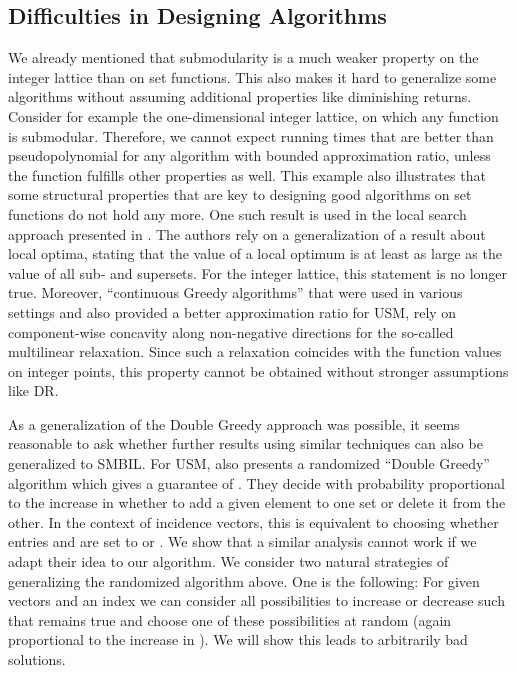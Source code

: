 \documentclass{article}
\theoremstyle{plain}
\theoremstyle{definition}
\begin{document}
\subsection{Difficulties in Designing Algorithms}\label{sec:BadRandom}
We already mentioned that submodularity is a much weaker property on the integer lattice than on set functions. 
This also makes it hard to generalize some algorithms without assuming additional properties like diminishing returns. 
Consider for example the one-dimensional integer lattice, on which any function is submodular. Therefore, we cannot expect 
running times that are better than pseudopolynomial for any algorithm with bounded approximation ratio, unless the function fulfills other properties as well.
This example also illustrates that some structural properties that are key to designing good algorithms on set functions do not hold any more. 
One such result is used in the local search approach presented in \cite{LocalSearch}. The authors rely on a generalization of a result about local optima, 
stating that the value of a local optimum  is at least as large as the value of all sub- and supersets. 
For the integer lattice, this statement is no longer true. 
Moreover, ``continuous Greedy algorithms'' that were used in various settings and also provided a better approximation ratio for USM,
rely on component-wise concavity along non-negative directions 
for the so-called multilinear relaxation. Since such a relaxation coincides with the function values on integer points, this property cannot be obtained 
without stronger assumptions like DR. 

As a generalization of the Double Greedy approach was possible, 
it seems reasonable to ask whether further results using similar techniques can also be generalized to SMBIL. 
For USM, \cite{DoubleGreedy} also presents a randomized ``Double Greedy'' algorithm which gives a guarantee of . 
They decide with probability proportional to the increase in  whether to add a given element to one set or delete it from the other. 
In the context of incidence vectors, this is equivalent to choosing whether entries  and  are set to  or . 
We show that a similar analysis cannot work if we adapt their idea to our algorithm.
We consider two natural strategies of generalizing the randomized algorithm above. One is the following:
For given vectors  and an index  we can consider all possibilities to increase  or decrease  such that
 remains true and choose one of these possibilities at random (again proportional to the increase in ). 
We will show this leads to arbitrarily bad solutions. 
\end{document}
